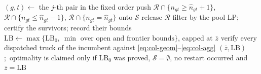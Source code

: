 \begin{algorithm}[!h]
\begin{algorithmic}[1]
      \State $(g,t) \gets$ the $j$-th pair in the fixed order
      \State push $\mathcal{R}\cap\{n_{gt}\ge \hat n_{gt}+1\}$,\;
             $\mathcal{R}\cap\{n_{gt}\le \hat n_{gt}-1\}$,\;
             $\mathcal{R}\cap\{n_{gt}= \hat n_{gt}\}$ onto $\mathcal{S}$
   \EndIf
   \State release $\mathcal{R}$
\EndWhile
{}
   \State filter by the pool LP; certify the survivors; record their bounds
\EndFor
\State $\mathrm{LB} \gets \max\bigl\{\mathrm{LB}_{0},\ \min\text{ over open and frontier bounds}\bigr\}$,
       capped at $\bar z$
\State verify every dispatched truck of the incumbent against
       \eqref{eq:col-geom}--\eqref{eq:col-agg}
\State \Return $(\bar z, \mathrm{LB})$;\ optimality is claimed only if $\mathrm{LB}_{0}$ was
       proved, $\mathcal{S}=\emptyset$, no restart occurred and $\bar z=\mathrm{LB}$
\end{algorithmic}
\end{algorithm}
